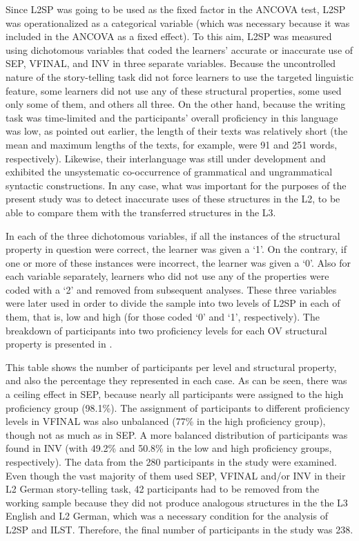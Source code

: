 \documentclass[output=paper,modfonts,nonflat, newtxmath]{langsci/langscibook}
\begin{document}
Since L2SP was going to be used as the fixed factor in the ANCOVA test, L2SP was operationalized as a categorical variable (which was necessary because it was included in the ANCOVA as a fixed effect). To this aim, L2SP was measured using dichotomous variables that coded the learners’ accurate or inaccurate use of SEP, VFINAL, and INV in three separate variables. Because the uncontrolled nature of the story-telling task did not force learners to use the targeted linguistic feature, some learners did not use any of these structural properties, some used only some of them, and others all three. On the other hand, because the writing task was time-limited and the participants’ overall proficiency in this language was low, as pointed out earlier, the length of their texts was relatively short (the mean and maximum lengths of the texts, for example, were 91 and 251 words, respectively). Likewise, their interlanguage was still under development and exhibited the unsystematic co-occurrence of grammatical and ungrammatical syntactic constructions. In any case, what was important for the purposes of the present study was to detect inaccurate uses of these structures in the L2, to be able to compare them with the transferred structures in the L3.

In each of the three dichotomous variables, if all the instances of the structural property in question were correct, the learner was given a ‘1’. On the contrary, if one or more of these instances were incorrect, the learner was given a ‘0’. Also for each variable separately, learners who did not use any of the properties were coded with a ‘2’ and removed from subsequent analyses. These three variables were later used in order to divide the sample into two levels of L2SP in each of them, that is, low and high (for those coded ‘0’ and ‘1’, respectively). The breakdown of participants into two proficiency levels for each OV structural property is presented in .

This table shows the number of participants per level and structural property, and also the percentage they represented in each case. As can be seen, there was a ceiling effect in SEP, because nearly all participants were assigned to the high proficiency group (98.1\%). The assignment of participants to different proficiency levels in VFINAL was also unbalanced (77\% in the high proficiency group), though not as much as in SEP. A more balanced distribution of participants was found in INV (with 49.2\% and 50.8\% in the low and high proficiency groups, respectively). The data from the 280 participants in the study were examined. Even though the vast majority of them used SEP, VFINAL and/or INV in their L2 German story-telling task, 42 participants had to be removed from the working sample because they did not produce analogous structures in the the L3 English and L2 German, which was a necessary condition for the analysis of L2SP and ILST. Therefore, the final number of participants in the study was 238.
\end{document}
